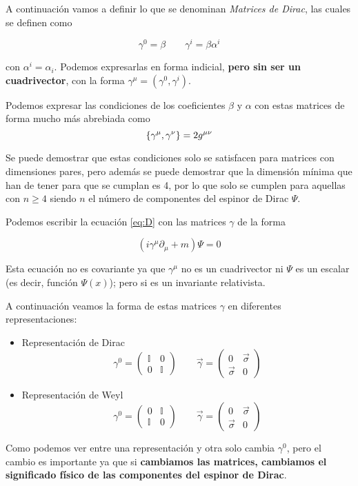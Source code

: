 A continuación vamos a definir lo que se denominan \textit{Matrices de Dirac}, las cuales se definen como

\[\gamma^{0}=\beta\qquad\gamma^{i}=\beta\alpha^{i}\]

con $\alpha^{i}=\alpha_{i}$. Podemos expresarlas en forma indicial, \textbf{pero sin ser un cuadrivector}, con la forma $\gamma^\mu=(\gamma^{0},\gamma^{i})$. 

Podemos expresar las condiciones de los coeficientes $\beta$ y $\alpha$ con estas matrices de forma mucho más abrebiada como 
\[\acomm{\gamma^{\mu}}{\gamma^{\nu}}=2g^{\mu\nu}\]

Se puede demostrar que estas condiciones solo se satisfacen para matrices con dimensiones pares, pero además se puede demostrar que la dimensión mínima que han de tener para que se cumplan es 4, por lo que solo se cumplen para aquellas con $n\geq4$ siendo $n$ el número de componentes del espinor de Dirac $\Psi$. 

Podemos escribir la ecuación \ref{eq:D} con las matrices $\gamma$ de la forma 

\[(i\gamma^{\mu}\partial_{\mu}+m)\Psi=0\]

Esta ecuación no es covariante ya que $\gamma^{\mu}$ no es un cuadrivector ni $\Psi$ es un escalar (es decir, función $\Psi(x)$); pero si es un invariante relativista. 

A continuación veamos la forma de estas matrices $\gamma$  en diferentes representaciones:
\begin{itemize}
  \item Representación de Dirac
  \[\gamma^{0}=\begin{pmatrix}
      \mathbb{I} & 0 \\
      0 & \mathbb{I} 
  \end{pmatrix}\qquad \vec{\gamma}= \begin{pmatrix}
      0 & \vec{\sigma} \\
      \vec{\sigma} & 0 
  \end{pmatrix}\]
  \item Representación de Weyl
  \[\gamma^{0}=\begin{pmatrix}
      0 & \mathbb{I} \\
      \mathbb{I} & 0 
  \end{pmatrix}\qquad \vec{\gamma}= \begin{pmatrix}
      0 & \vec{\sigma} \\
      \vec{\sigma} & 0 
  \end{pmatrix}\]
\end{itemize}
Como podemos ver entre una representación y otra solo cambia $\gamma^{0}$, pero el cambio es importante ya que si \textbf{cambiamos las matrices, cambiamos el significado físico de las componentes del espinor de Dirac}.

